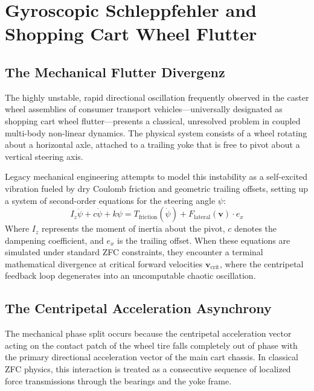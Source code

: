 \documentclass[11pt,a4paper]{article}
\begin{document}
\section{Gyroscopic Schleppfehler and Shopping Cart Wheel Flutter}

\subsection{The Mechanical Flutter Divergenz}
The highly unstable, rapid directional oscillation frequently observed in the caster wheel assemblies of consumer transport vehicles—universally designated as shopping cart wheel flutter—presents a classical, unresolved problem in coupled multi-body non-linear dynamics. The physical system consists of a wheel rotating about a horizontal axle, attached to a trailing yoke that is free to pivot about a vertical steering axis. 

Legacy mechanical engineering attempts to model this instability as a self-excited vibration fueled by dry Coulomb friction and geometric trailing offsets, setting up a system of second-order equations for the steering angle $\psi$:
\begin{equation}
    I_z \ddot{\psi} + c \dot{\psi} + k \psi = T_{\text{friction}}(\dot{\psi}) + F_{\text{lateral}}(\bm{v}) \cdot e_x
\end{equation}
Where $I_z$ represents the moment of inertia about the pivot, $c$ denotes the dampening coefficient, and $e_x$ is the trailing offset. When these equations are simulated under standard ZFC constraints, they encounter a terminal mathematical divergence at critical forward velocities $\bm{v}_{\text{crit}}$, where the centripetal feedback loop degenerates into an uncomputable chaotic oscillation.

\subsection{The Centripetal Acceleration Asynchrony}
The mechanical phase split occurs because the centripetal acceleration vector acting on the contact patch of the wheel tire falls completely out of phase with the primary directional acceleration vector of the main cart chassis. In classical ZFC physics, this interaction is treated as a consecutive sequence of localized force transmissions through the bearings and the yoke frame. 
\end{document}
